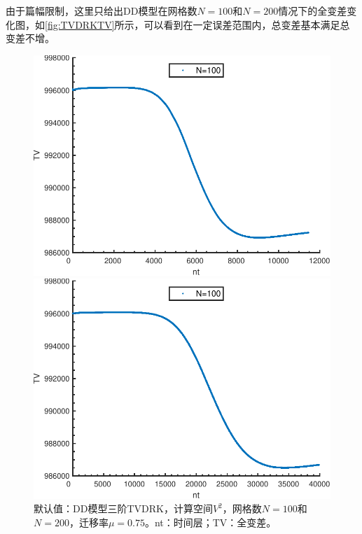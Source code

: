 由于篇幅限制，这里只给出DD模型在网格数$N=100$和$N=200$情况下的全变差变化图，如\autoref{fig:TVDRKTV}所示，可以看到在一定误差范围内，总变差基本满足总变差不增。
\begin{figure}
    \centering
    \begin{minipage}{0.45\linewidth}
        \centering
        \includegraphics[width=\linewidth]{figure/TVDRKN100.pdf}
    \end{minipage}
    \hspace{1cm}
    \begin{minipage}{0.45\linewidth}
        \centering
        \includegraphics[width=\linewidth]{figure/TVDRKN200.pdf}
    \end{minipage}
    \caption{默认值：DD模型三阶TVDRK，计算空间$V^2$，网格数$N=100$和$N=200$，迁移率$\mu=0.75$。nt：时间层；TV：全变差。}
    \label{fig:TVDRKTV}
\end{figure}

